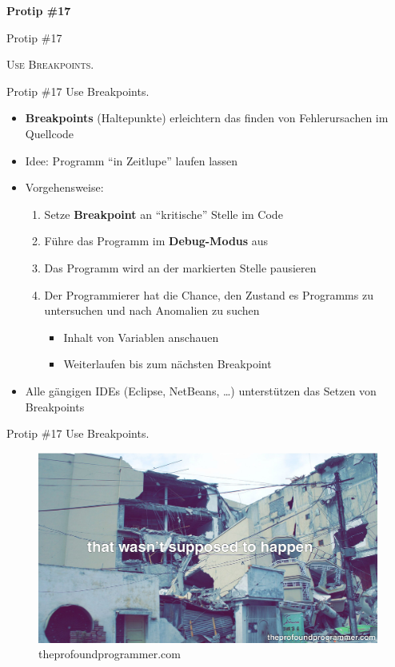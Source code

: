 \documentclass[18pt]{beamer}
\newcommand{\quotes}[1]{``#1''}
\begin{document}
\begin{frame}{\quad}
    \center
    \Huge{\textbf{Protip \#17}}
\end{frame}

\begin{frame}{Protip \#17}
    \begin{block}{}
        \center
        \textsc{Use Breakpoints.}
    \end{block}
\end{frame}

\begin{frame}{Protip \#17 Use Breakpoints.}
    \begin{itemize}
        \item \textbf{Breakpoints} (Haltepunkte) erleichtern das finden von Fehlerursachen im Quellcode
        \item Idee: Programm \quotes{in Zeitlupe} laufen lassen
        \item Vorgehensweise:
        \begin{enumerate}
            \item Setze \textbf{Breakpoint} an \quotes{kritische} Stelle im Code
            \item Führe das Programm im \textbf{Debug-Modus} aus
            \item Das Programm wird an der markierten Stelle \alert{pausieren}
            \item Der Programmierer hat die Chance, den Zustand es Programms zu untersuchen und nach Anomalien zu suchen
            \begin{itemize}
                \item Inhalt von Variablen anschauen
                \item Weiterlaufen bis zum nächsten Breakpoint
            \end{itemize}
        \end{enumerate}
        \item Alle gängigen IDEs (Eclipse, NetBeans, \dots) unterstützen das Setzen von Breakpoints
    \end{itemize}
\end{frame}

\begin{frame}{Protip \#17 Use Breakpoints.}
    \begin{figure}
        \includegraphics[scale=.15]{img/NG8XW8J8GT.jpg}
        \caption{\footnotesize{theprofoundprogrammer.com}}
    \end{figure}
\end{frame}
\end{document}
